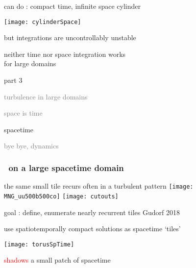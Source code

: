 \begin{frame}{can do : compact time, infinite space cylinder}
\begin{center}
\texttt{[image: cylinderSpace]}
\end{center}
\end{frame}

\begin{frame}{but integrations are uncontrollably unstable}
\begin{center}
{\huge neither} time {\huge nor} space integration {\huge works} \\
for large domains
\end{center}

\vfill
\color{red}{rethink the formulation!}
\end{frame}

\begin{frame}{part 3}
\begin{enumerate}
              \item
    \textcolor{gray}{\small
turbulence in large domains
              \item
space is time
    }
              \item {\Large
spacetime
    }\textcolor{gray}{\small
              \item
bye bye, dynamics
                    }
            \end{enumerate}
\end{frame}

\begin{frame}
    \frametitle{\KS\ on a large spacetime domain}
\begin{block}{the same small tile recurs often in a turbulent pattern}
\texttt{[image: MNG\_uu500b500co]}
\texttt{[image: cutouts]}
\end{block}
goal : define, enumerate nearly recurrent tiles
\vfill\hfill        Gudorf 2018
\end{frame}

\begin{frame}{use spatiotemporally compact solutions as spacetime `tiles'}
\begin{center}
\texttt{[image: torusSpTime]}
\end{center}
\textcolor{red}{shadows} a small patch of spacetime
\end{frame}

